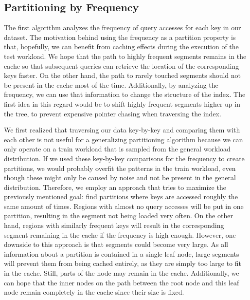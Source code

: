 \subsection{Partitioning by Frequency} \label{sec:frequency}
The first algorithm analyzes the frequency of query accesses for each key in our dataset. The motivation behind using the frequency as a partition property is that, hopefully, we can benefit from caching effects during the execution of the test workload. We hope that the path to highly frequent segments remains in the cache so that subsequent queries can retrieve the location of the corresponding keys faster. On the other hand, the path to rarely touched segments should not be present in the cache most of the time. Additionally, by analyzing the frequency, we can use that information to change the structure of the index. The first idea in this regard would be to shift highly frequent segments higher up in the tree, to prevent expensive pointer chasing when traversing the index.

We first realized that traversing our data key-by-key and comparing them with each other is not useful for a generalizing partitioning algorithm because we can only operate on a train workload that is sampled from the general workload distribution. If we used these key-by-key comparisons for the frequency to create partitions, we would probably overfit the patterns in the train workload, even though these might only be caused by noise and not be present in the general distribution. Therefore, we employ an approach that tries to maximize the previously mentioned goal: find partitions where keys are accessed roughly the same amount of times. Regions with almost no query accesses will be put in one partition, resulting in the segment not being loaded very often. On the other hand, regions with similarly frequent keys will result in the  corresponding segment remaining in the cache if the frequency is high enough. However, one downside to this approach is that segments could become very large. As all information about a partition is contained in a single leaf node, large segments will prevent them from being cached entirely, as they are simply too large to fit in the cache. Still, parts of the node may remain in the cache. Additionally, we can hope that the inner nodes on the path between the root node and this leaf node remain completely in the cache since their size is fixed.

